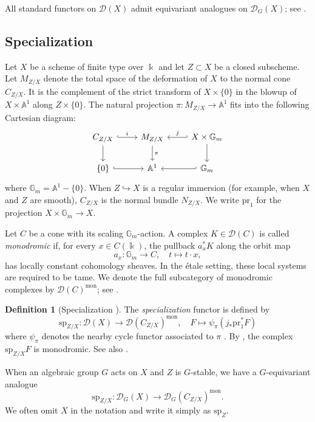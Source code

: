\documentclass[11pt]{amsart}
\numberwithin{equation}{section}
\theoremstyle{definition}
\newtheorem{definition}[theorem]{Definition}
\def\lra{\longrightarrow }
\DeclareMathOperator{\Bl}{\mathrm{Bl}}
\def\sp{\mathrm{sp}}
\DeclareMathOperator{\mon}{mon}
\def\A{\mathbb{A}}
\def\Gm{\mathbb{G}_m}
\def\pr{\mathrm{pr}}
\begin{document}
All standard functors on $\mathscr D(X)$ admit equivariant analogues on $\mathscr D_G(X)$; see \cite[Section~6.5]{Achar}.

\subsection{Specialization}\label{ss:specialization}

Let $X$ be a scheme of finite type over $\Bbbk$ and let $Z\subset X$ be a closed subscheme. 
Let $M_{Z/X}$ denote the total space of the deformation of $X$ to the normal cone $C_{Z/X}$.
It is the complement of the strict transform of $X\times\{0\}$ in the blowup %
of $X\times \A^1$ along $Z\times \{0\}$.
The natural projection $\pi:M_{Z/X}\to\A^1$ fits into the following Cartesian diagram:
\[\begin{tikzcd}
    	C_{Z/X}\arrow[r,hook,"i"]\arrow[d]&M_{Z/X}\arrow[d,"\pi"]& X\times \Gm\arrow[l,hook',"j"']\arrow[d]\\ \{0\}\arrow[r,hook]&\A^1&\Gm\arrow[l,hook']
    \end{tikzcd}\]
where $\Gm=\A^1-\{0\}$. When $Z\hookrightarrow X$ is a regular immersion (for example, when $X$ and $Z$ are smooth), $C_{Z/X}$ is the normal bundle $N_{Z/X}$. 
We write $\pr_1$ for the projection $X\times \Gm \to X$.

\smallskip

Let $C$ be a cone with its scaling $\Gm$-action.
A complex $K\in\mathscr D(C)$ is called \emph{monodromic} if, for every $x\in C(\Bbbk)$, the pullback $a_x^*K$ along the orbit map
\[
a_x:\Gm\longrightarrow C,\quad t\mapsto t\cdot x,
\]
has locally constant cohomology sheaves.
In the \'etale setting, these local systems are required to be tame.
We denote the full subcategory of monodromic complexes by
$\mathscr D(C)^{\mon}$; see
\cite[Definition~3.1 and Sections~5 and~9]{verdier}.

\begin{definition}[Specialization {\cite[(8.2)]{verdier}}]
	The \emph{specialization} functor is defined by 
    \[\sp_{Z/X}:\mathscr D(X)\to \mathscr D(C_{Z/X})^{\mon}, \quad F\mapsto \psi_\pi(j_*\pr_1^*F)\]
    where $\psi_\pi$ denotes the nearby cycle functor associated to $\pi$ \cite{SGA7-nearby}. 
    By \cite[(SP1)]{verdier}, the complex $\sp_{Z/X}F$ is monodromic.
    See also \cite[Appendix~A.1]{bezrukavnikov2026affinespringerfibersmall}.
    
    When an algebraic group $G$ acts on $X$ and $Z$ is $G$-stable, we have a $G$-equivariant analogue
    \[\sp_{Z/X}:\mathscr D_G(X) \lra \mathscr D_{G}(C_{Z/X})^{\mon}.\]
    We often omit $X$ in the notation and write it simply as $\sp_Z$.
\end{definition}
\end{document}
